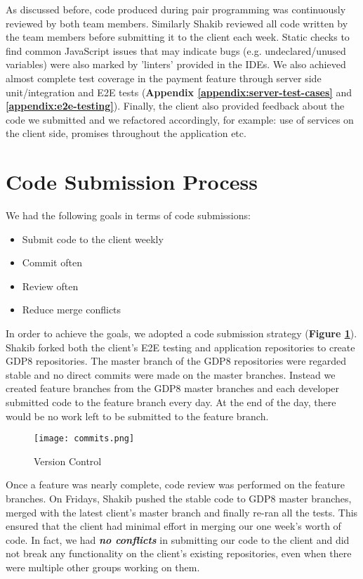 As discussed before, code produced during pair programming was continuously reviewed by both team members. Similarly Shakib reviewed all code written by the team members before submitting it to the client each week. Static checks to find common JavaScript issues that may indicate bugs (e.g. undeclared/unused variables) were also marked by 'linters' provided in the IDEs. We also achieved almost complete test coverage in the payment feature through server side unit/integration and E2E tests (\textbf{Appendix \ref{appendix:server-test-cases}} and \textbf{\ref{appendix:e2e-testing}}). Finally, the client also provided feedback about the code we submitted and we refactored accordingly, for example: use of services on the client side, promises throughout the application etc.

\section{Code Submission Process}
\label{sec:code-submission-process}

We had the following goals in terms of code submissions:

\begin{itemize}

  \item Submit code to the client weekly
  \item Commit often
  \item Review often
  \item Reduce merge conflicts

\end{itemize}

In order to achieve the goals, we adopted a code submission strategy (\textbf{Figure \ref{fig:version-control}}). Shakib forked both the client's E2E testing and application repositories to create GDP8 repositories. The master branch of the GDP8 repositories were regarded stable and no direct commits were made on the master branches. Instead we created feature branches from the GDP8 master branches and each developer submitted code to the feature branch every day. At the end of the day, there would be no work left to be submitted to the feature branch.\\

\begin{figure}[!hbt]
  	\centering
 	\texttt{[image: commits.png]}
  	\caption{Version Control}
 	\label{fig:version-control}
\end{figure}

Once a feature was nearly complete, code review was performed on the feature branches. On Fridays, Shakib pushed the stable code to GDP8 master branches, merged with the latest client's master branch and finally re-ran all the tests. This ensured that the client had minimal effort in merging our one week's worth of code. In fact, we had \textbf{\textit{no conflicts}} in submitting our code to the client and did not break any functionality on the client's existing repositories, even when there were multiple other groups working on them.
